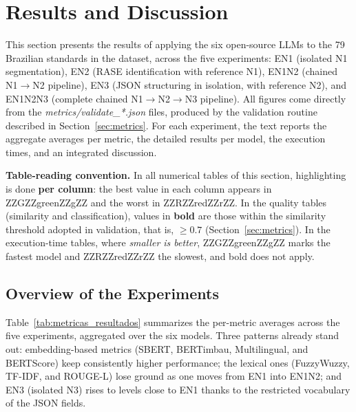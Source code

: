 \documentclass[a4paper,fleqn]{cas-sc}
\newcommand{\melhor}[1]{ZZGZZ#1ZZgZZ}
\newcommand{\pior}[1]{ZZRZZ#1ZZrZZ}
\begin{document}
\section{Results and Discussion}\label{sec:results}

This section presents the results of applying the six open-source LLMs to the 79 Brazilian standards in the dataset, across the five experiments: EN1 (isolated N1 segmentation), EN2 (RASE identification with reference N1), EN1N2 (chained N1$\rightarrow$N2 pipeline), EN3 (JSON structuring in isolation, with reference N2), and EN1N2N3 (complete chained N1$\rightarrow$N2$\rightarrow$N3 pipeline). All figures come directly from the \textit{metrics/validate\_*.json} files, produced by the validation routine described in Section~\ref{sec:metrics}. For each experiment, the text reports the aggregate averages per metric, the detailed results per model, the execution times, and an integrated discussion.

\textbf{Table-reading convention.} In all numerical tables of this section, highlighting is done \textbf{per column}: the best value in each column appears in \melhor{green} and the worst in \pior{red}. In the quality tables (similarity and classification), values in \textbf{bold} are those within the similarity threshold adopted in validation, that is, \(\geq 0.7\) (Section~\ref{sec:metrics}). In the execution-time tables, where \emph{smaller is better}, \melhor{green} marks the fastest model and \pior{red} the slowest, and bold does not apply.

\subsection{Overview of the Experiments}

Table~\ref{tab:metricas_resultados} summarizes the per-metric averages across the five experiments, aggregated over the six models. Three patterns already stand out: embedding-based metrics (SBERT, BERTimbau, Multilingual, and BERTScore) keep consistently higher performance; the lexical ones (FuzzyWuzzy, TF-IDF, and ROUGE-L) lose ground as one moves from EN1 into EN1N2; and EN3 (isolated N3) rises to levels close to EN1 thanks to the restricted vocabulary of the JSON fields.
\end{document}
